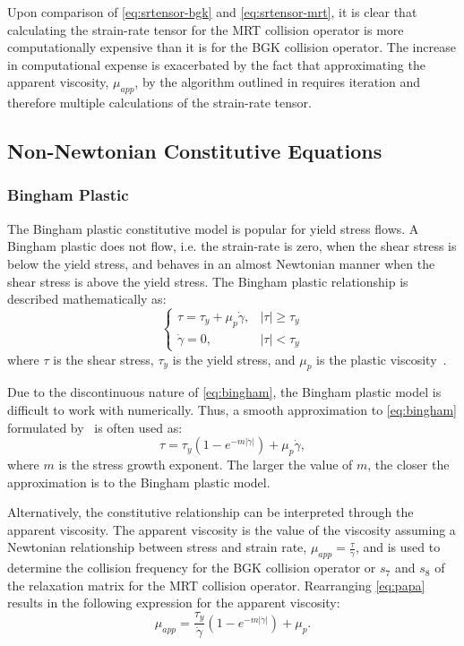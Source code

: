 \documentclass[pdftex,ms]{pittetd}
\begin{document}
Upon comparison of \eqref{eq:srtensor-bgk} and \eqref{eq:srtensor-mrt}, it is clear that calculating the strain-rate tensor for the MRT collision operator is more computationally expensive than it is for the BGK collision operator.
The increase in computational expense is exacerbated by the fact that approximating the apparent viscosity, $\mu_{app}$, by the algorithm outlined in  requires iteration and therefore multiple calculations of the strain-rate tensor.

\subsection{Non-Newtonian Constitutive Equations}

\subsubsection{Bingham Plastic} \label{sec:bp}

The Bingham plastic constitutive model is popular for yield stress flows.
A Bingham plastic does not flow, i.e. the strain-rate is zero, when the shear stress is below the yield stress, and behaves in an almost Newtonian manner when the shear stress is above the yield stress.
The Bingham plastic relationship is described mathematically as:
\begin{equation} \label{eq:bingham}
\begin{cases}
\tau = \tau_y + \mu_p \dot{\gamma}, & |\tau| \geq \tau_y \\
\dot{\gamma} = 0, & |\tau| < \tau_y
\end{cases}
\end{equation}
\noindent where $\tau$ is the shear stress, $\tau_y$ is the yield stress, and $\mu_p$ is the plastic viscosity~\cite{bingham1922fluidity}.

Due to the discontinuous nature of \eqref{eq:bingham}, the Bingham plastic model is difficult to work with numerically.
Thus, a smooth approximation to \eqref{eq:bingham} formulated by~\citet{papanastasiou1987flows} is often used as:
\begin{equation} \label{eq:papa}
\tau = \tau_y (1 - e^{-m |\dot{\gamma}|}) + \mu_p \dot{\gamma},
\end{equation}
\noindent where $m$ is the stress growth exponent.
The larger the value of $m$, the closer the approximation is to the Bingham plastic model.

Alternatively, the constitutive relationship can be interpreted through the apparent viscosity.
The apparent viscosity is the value of the viscosity assuming a Newtonian relationship between stress and strain rate, $\mu_{app} = \frac{\tau}{\dot{\gamma}}$, and is used to determine the collision frequency for the BGK collision operator or $s_7$ and $s_8$ of the relaxation matrix for the MRT collision operator.
Rearranging \eqref{eq:papa} results in the following expression for the apparent viscosity:
\begin{equation} \label{eq:bing-mu-app}
\mu_{app} = \frac{\tau_y}{\dot{\gamma}} (1 - e^{-m |\dot{\gamma}|}) + \mu_p.
\end{equation}
\end{document}
